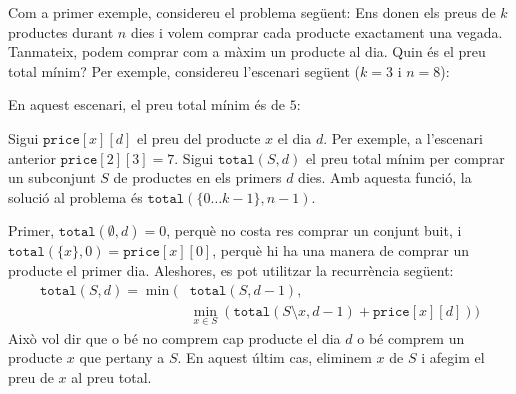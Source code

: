 Com a primer exemple, considereu el problema següent: Ens donen els
preus de $k$ productes durant $n$ dies i volem comprar cada producte
exactament una vegada. Tanmateix, podem comprar com a màxim un
producte al dia. Quin és el preu total mínim? Per exemple, considereu
l'escenari següent ($k=3$ i $n=8$):
\begin{center}
\end{center}
En aquest escenari, el preu total mínim és de $5$:
\begin{center}
\end{center}


Sigui $\texttt{price}[x][d]$ el preu del producte $x$ el dia $d$. Per
exemple, a l'escenari anterior $\texttt{price}[2][3] = 7$. Sigui
$\texttt{total}(S,d)$ el preu total mínim per
comprar un subconjunt $S$ de productes en els primers $d$ dies. Amb aquesta
funció, la solució al problema és $\texttt{total}(\{0 \ldots
k-1\},n-1)$.

Primer, $\texttt{total}(\emptyset,d) = 0$, perquè no costa res comprar
un conjunt buit, i $\texttt{total}(\{x\},0) = \texttt{price}[x][0]$,
perquè hi ha una manera de comprar un producte el primer
dia. Aleshores, es pot utilitzar la recurrència següent:
\begin{equation*}
\begin{split}
\texttt{total}(S,d) = \min( & \texttt{total}(S,d-1), \\
& \min_{x \in S} (\texttt{total}(S \setminus x,d-1)+\texttt{price}[x][d]))
\end{split}
\end{equation*}
Això vol dir que o bé no comprem cap producte el dia $d$ o bé comprem un
producte $x$ que pertany a $S$. En aquest últim cas, eliminem $x$ de
$S$ i afegim el preu de $x$ al preu total.


